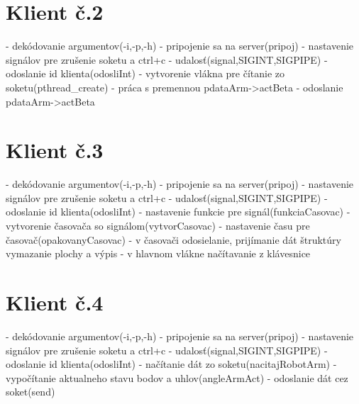 \documentclass{article}
\begin{document}
\section{Klient č.2}
- dekódovanie argumentov(-i,-p,-h)\newline
- pripojenie sa na server(pripoj)\newline
- nastavenie signálov pre zrušenie soketu a ctrl+c - udalosť(signal,SIGINT,SIGPIPE)\newline
- odoslanie id klienta(odosliInt)\newline
- vytvorenie vlákna pre čítanie zo soketu(pthread\_create)\newline
- práca s premennou pdataArm->actBeta\newline
- odoslanie pdataArm->actBeta\newline
\section{Klient č.3}
- dekódovanie argumentov(-i,-p,-h)\newline
- pripojenie sa na server(pripoj)\newline
- nastavenie signálov pre zrušenie soketu a ctrl+c - udalosť(signal,SIGINT,SIGPIPE)\newline
- odoslanie id klienta(odosliInt)\newline
- nastavenie funkcie pre signál(funkciaCasovac) \newline
- vytvorenie časovača so signálom(vytvorCasovac)\newline
- nastavenie času pre časovač(opakovanyCasovac)\newline
- v časovači odosielanie, prijímanie dát štruktúry vymazanie plochy a výpis\newline
- v hlavnom vlákne načítavanie z klávesnice\newline
\section{Klient č.4}
- dekódovanie argumentov(-i,-p,-h)\newline
- pripojenie sa na server(pripoj)
- nastavenie signálov pre zrušenie soketu a ctrl+c - udalosť(signal,SIGINT,SIGPIPE)\newline
- odoslanie id klienta(odosliInt)\newline
- načítanie dát zo soketu(nacitajRobotArm)\newline
- vypočítanie aktualneho stavu bodov a uhlov(angleArmAct)\newline
- odoslanie dát cez soket(send)\newline
\end{document}
